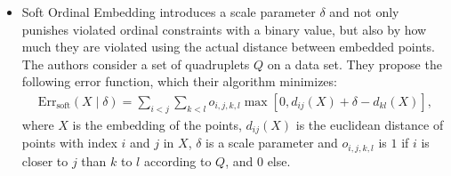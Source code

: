 \begin{itemize}
    \item Soft Ordinal Embedding  \citep[SOE,][]{teradaLocalOrdinalEmbedding2014} 
        introduces a scale parameter $\delta$ and not only punishes violated ordinal constraints
        with a binary value, but also by how much they are violated using the
        actual distance between embedded points.
        The authors consider a set of quadruplets $Q$ on a data set. 
        They propose the following error function, which their algorithm minimizes:
        \begin{align*}
            \text{Err}_{\text{soft}}(X  \mid  \delta) = \sum_{i<j} \sum_{k<l} o_{i,j,k,l} 
            \max [0, d_{ij}(X) + \delta - d_{kl}(X)]
        ,\end{align*}
        where $X$ is the embedding of the points, $d_{ij}(X)$ is the euclidean distance 
        of points with index $i$ and $j$ in $X$, $\delta$ is a scale parameter and $o_{i,j,k,l}$
        is $1$ if $i$ is closer to $j$ than $k$ to $l$ according to $Q$, and $0$ else.


\end{itemize}

